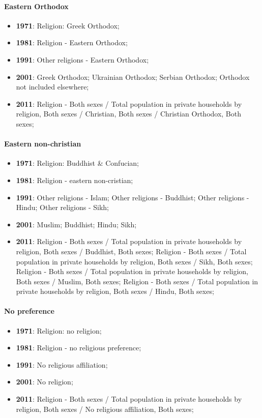 \documentclass[a4paper]{article}
\begin{document}
\paragraph{Eastern Orthodox}
\begin{itemize}
   \item{\textbf{1971}:  Religion: Greek Orthodox;}
   \item{\textbf{1981}:  Religion - Eastern Orthodox;}
   \item{\textbf{1991}:  Other religions - Eastern Orthodox;}
   \item{\textbf{2001}:  Greek Orthodox; Ukrainian Orthodox; Serbian Orthodox; Orthodox not included elsewhere;}
   \item{\textbf{2011}:  Religion - Both sexes / Total population in private households by religion, Both sexes / Christian, Both sexes / Christian Orthodox, Both sexes;}
\end{itemize}

\paragraph{Eastern non-christian}
\begin{itemize}
   \item{\textbf{1971}:  Religion: Buddhist \& Confucian;}
   \item{\textbf{1981}:  Religion - eastern non-cristian;}
   \item{\textbf{1991}:  Other religions - Islam; Other religions - Buddhist; Other religions - Hindu; Other religions - Sikh;}
   \item{\textbf{2001}:  Muslim; Buddhist; Hindu; Sikh;}
   \item{\textbf{2011}:  Religion - Both sexes / Total population in private households by religion, Both sexes / Buddhist, Both sexes; Religion - Both sexes / Total population in private households by religion, Both sexes / Sikh, Both sexes; Religion - Both sexes / Total population in private households by religion, Both sexes / Muslim, Both sexes; Religion - Both sexes / Total population in private households by religion, Both sexes / Hindu, Both sexes;}
\end{itemize}

\paragraph{No preference}
\begin{itemize}
   \item{\textbf{1971}:  Religion: no religion;}
   \item{\textbf{1981}:  Religion - no religious preference;}
   \item{\textbf{1991}:  No religious affiliation;}
   \item{\textbf{2001}:  No religion;}
   \item{\textbf{2011}:  Religion - Both sexes / Total population in private households by religion, Both sexes / No religious affiliation, Both sexes;}
\end{itemize}
\end{document}
